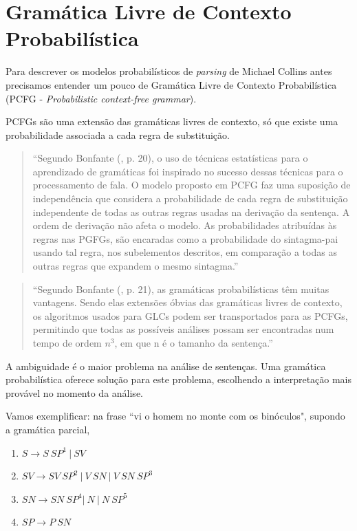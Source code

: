 \section{Gramática Livre de Contexto Probabilística}
\label{sec:pcfg}

Para descrever os modelos  probabilísticos  de \emph{parsing} de Michael Collins antes precisamos entender um pouco de Gramática Livre de Contexto Probabilística (PCFG - \emph{Probabilistic context-free grammar}).

PCFGs são uma extensão das gramáticas livres de contexto, só que existe uma probabilidade associada a cada regra de substituição.


\begin{quotation}
\footnotesize
``Segundo Bonfante (\cite{bonfante03}, p. 20), o uso de técnicas estatísticas para o aprendizado de gramáticas foi inspirado no sucesso dessas técnicas para o processamento de fala. O modelo proposto em PCFG faz uma suposição de independência que considera a probabilidade de cada regra de substituição independente de todas as outras regras usadas na derivação da sentença. A ordem de derivação não afeta o modelo. As probabilidades atribuídas às regras nas PGFGs, são encaradas como a probabilidade do sintagma-pai usando tal regra, nos subelementos descritos, em comparação a todas as outras regras que expandem o mesmo sintagma.''
\end{quotation}

\begin{quotation}
\footnotesize
``Segundo Bonfante (\cite{bonfante03}, p. 21), as gramáticas probabilísticas têm muitas vantagens. Sendo elas extensões óbvias das gramáticas livres de contexto, os algoritmos usados para GLCs podem ser transportados para as PCFGs, permitindo que todas as possíveis análises possam ser encontradas num tempo de ordem $n^3$, em que n é o tamanho da sentença.''
\end{quotation}

A ambiguidade é o maior problema na análise de sentenças. Uma gramática probabilística oferece solução para este problema, escolhendo a interpretação mais provável no momento da análise.

Vamos exemplificar: na frase ``vi o homem no monte com os binóculos", supondo a gramática parcial,

\begin{enumerate}
  \item $ S \rightarrow S \  SP^1 \ |\ SV $
  \item $ SV \rightarrow SV \ SP^2  \ |\  V \ SN \ |\ V \ SN \ SP^3 $
  \item $ SN \rightarrow SN \ SP^4  | \  N \  |  \ N \ SP^5 $
  \item $ SP \rightarrow P \ SN  $
\end{enumerate}


